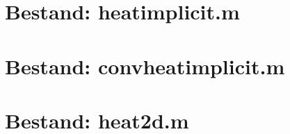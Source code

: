 \documentclass[a4paper,kulak]{kulakarticle} %
\newcommand{\inputcode}[1]{
	
}
\begin{document}
\newpage
\section{Bestand: heat\textunderscore implicit.m}
	\label{code:heat_implicit}
	\inputcode{heat_implicit}
	
\newpage
\section{Bestand: convheat\textunderscore implicit.m}
\label{code:convheat_implicit}
\inputcode{convheat_implicit}

\section{Bestand: heat2d.m}
\label{code:heat2d}
\inputcode{heat2d}
	
\end{document}
